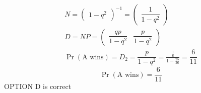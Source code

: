 \documentclass[journal,12pt,twocolumn]{IEEEtran}
\theoremstyle{definition}
\providecommand{\pr}[1]{\ensuremath{\Pr\left(#1\right)}}
\newcommand{\myvec}[1]{\ensuremath{\begin{pmatrix}#1\end{pmatrix}}}
\begin{document}
    \begin{align}
        N = \myvec{1 - q^2}^{-1} = \myvec{\dfrac{1}{1-q^2}}\\
        D = NP = \myvec{\dfrac{qp}{1 - q^2} & \dfrac{p}{1 - q^2}}\\
        \pr{\text{A wins}} = D_2 = \dfrac{p}{1 - q^2} = \frac{\frac{1}{6}}{1 - \frac{25}{36}} = \dfrac{6}{11}
    \end{align}
        \centering
\[
    \pr{\text{A wins}} = \dfrac{6}{11}
\]
OPTION D is correct
\end{document}

